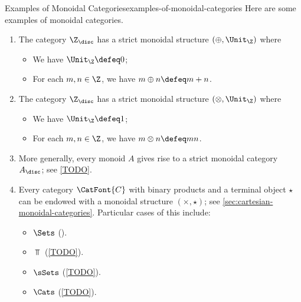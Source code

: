 \begin{example}{Examples of Monoidal Categories}{examples-of-monoidal-categories}%
    Here are some examples of monoidal categories.
    \begin{enumerate}
        \item\label{examples-of-monoidal-categories-the-integers-with-addition}The category $\Z_{\disc}$ has a strict monoidal structure $(\oplus,\Unit_{\Z})$ where
            \begin{itemize}
                \item We have $\Unit_{\Z}\defeq0$;
                \item For each $m,n\in\Z$, we have $m\oplus n\defeq m+n$.
            \end{itemize}
        \item\label{examples-of-monoidal-categories-the-integers-with-multiplication}The category $\Z_{\disc}$ has a strict monoidal structure $(\otimes,\Unit_{\Z})$ where
            \begin{itemize}
                \item We have $\Unit_{\Z}\defeq1$;
                \item For each $m,n\in\Z$, we have $m\otimes n\defeq mn$.
            \end{itemize}
        \item\label{examples-of-monoidal-categories-monoids}More generally, every monoid $A$ gives rise to a strict monoidal category $A_{\disc}$; see \cref{TODO}.
        \item\label{examples-of-monoidal-categories-cartesian-monoidal-categories}Every category $\CatFont{C}$ with binary products and a terminal object $\star$ can be endowed with a monoidal structure $(\times,\star)$; see \cref{sec:cartesian-monoidal-categories}. Particular cases of this include:
            \begin{itemize}
                \item $\Sets$     ().
                \item $\Top$      (\cref{TODO}).
                \item $\sSets$    (\cref{TODO}).
                \item $\Cats$     (\cref{TODO}).

\end{itemize}
\end{enumerate}
\end{example}
